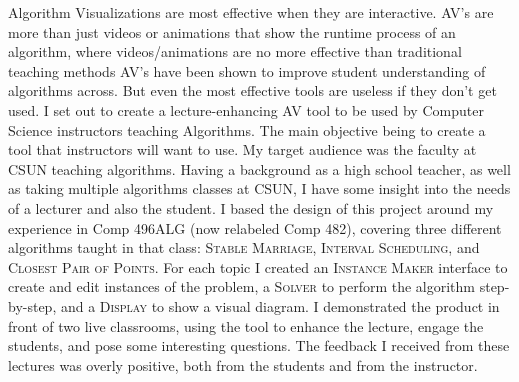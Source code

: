 \hspace{-0.3in}
Algorithm Visualizations are most effective when they are interactive. 
AV's are more than just videos or animations that show the runtime process of an algorithm, 
where videos/animations are no more effective than traditional teaching methods 
AV's have been shown to improve student understanding of algorithms across. 
But even the most effective tools are useless if they don't get used. 
\newline\newline
I set out to create a lecture-enhancing AV tool 
to be used by Computer Science instructors teaching Algorithms.
The main objective being to create a tool that instructors will want to use. 
My target audience was the faculty at CSUN teaching algorithms. 
Having a background as a high school teacher, as well as taking multiple algorithms classes at CSUN,
I have some insight into the needs of a lecturer and also the student. 
\newline\newline
I based the design of this project around my experience in Comp 496ALG (now relabeled Comp 482),
covering three different algorithms taught in that class: \textsc{Stable Marriage}, \textsc{Interval
Scheduling}, and \textsc{Closest Pair of Points}. 
For each topic I created 
an \textsc{Instance Maker} interface to create and edit instances of the problem, 
a \textsc{Solver} to perform the algorithm step-by-step, 
and a \textsc{Display} to show a visual diagram.
\newline\newline
I demonstrated the product in front of two live classrooms, 
using the tool to enhance the lecture, engage the students, and pose some interesting questions. 
The feedback I received from these lectures was overly positive, both from the students and from the instructor. 